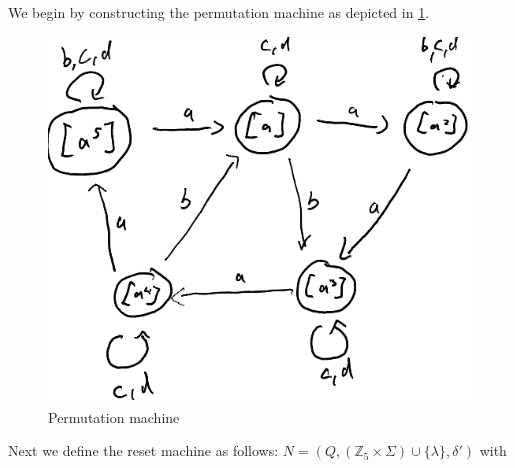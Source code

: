 \documentclass[a4paper,12pt,numbers=noenddot]{scrreport}
\begin{document}
\section{}
We begin by constructing the permutation machine as depicted in \ref{fig:permutation machine}.
\begin{figure}[H]
    \centering
    \includegraphics[width=0.5\linewidth]{Permutation_Machine.png}
    \caption{Permutation machine}
    \label{fig:permutation machine}
\end{figure}
Next we define the reset machine as follows: $N = (Q, (\mathbb{Z}_5 \times \Sigma) \cup \{\lambda\}, \delta')$ with \\
\end{document}
